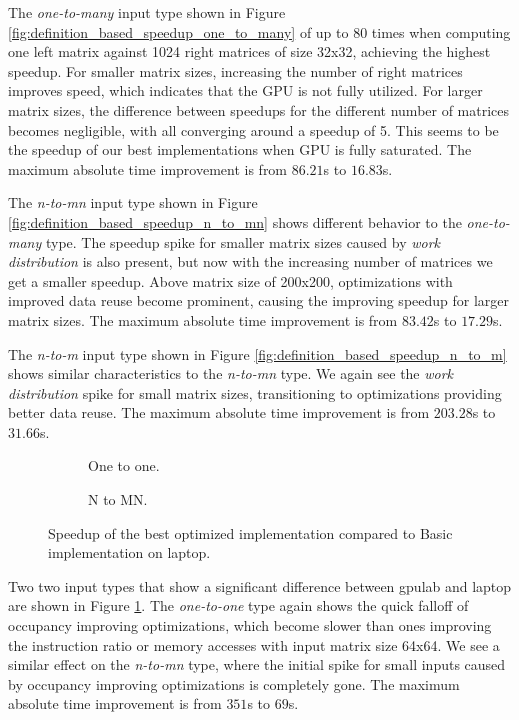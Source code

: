 The \textit{one-to-many} input type shown in Figure \ref{fig:definition_based_speedup_one_to_many} of up to 80 times when computing one left matrix against 1024 right matrices of size 32x32, achieving the highest speedup. For smaller matrix sizes, increasing the number of right matrices improves speed, which indicates that the GPU is not fully utilized. For larger matrix sizes, the difference between speedups for the different number of matrices becomes negligible, with all converging around a speedup of 5. This seems to be the speedup of our best implementations when GPU is fully saturated. The maximum absolute time improvement is from $86.21$s to $16.83$s. 

The \textit{n-to-mn} input type shown in Figure \ref{fig:definition_based_speedup_n_to_mn} shows different behavior to the \textit{one-to-many} type. The speedup spike for smaller matrix sizes caused by \textit{work distribution} is also present, but now with the increasing number of matrices we get a smaller speedup. Above matrix size of 200x200, optimizations with improved data reuse become prominent, causing the improving speedup for larger matrix sizes. The maximum absolute time improvement is from $83.42$s to $17.29$s. 

The \textit{n-to-m} input type shown in Figure \ref{fig:definition_based_speedup_n_to_m} shows similar characteristics to the \textit{n-to-mn} type. We again see the \textit{work distribution} spike for small matrix sizes, transitioning to optimizations providing better data reuse. The maximum absolute time improvement is from $203.28$s to $31.66$s.

\begin{figure}[ht]
	\centering	
	\begin{subfigure}{0.4\textwidth}
		\centering
		\def\svgwidth{\textwidth}
		
		\caption{One to one.}
	\end{subfigure}
	\begin{subfigure}{0.4\textwidth}
		\centering
		\def\svgwidth{\textwidth}
		
		\caption{N to MN.}
	\end{subfigure}
	\caption{Speedup of the best optimized implementation compared to Basic implementation on laptop.}
	\label{fig:definition_based_speedup_laptop}
\end{figure}

Two two input types that show a significant difference between gpulab and laptop are shown in Figure \ref{fig:definition_based_speedup_laptop}. The \textit{one-to-one} type again shows the quick falloff of occupancy improving optimizations, which become slower than ones improving the instruction ratio or memory accesses with input matrix size 64x64. We see a similar effect on the \textit{n-to-mn} type, where the initial spike for small inputs caused by occupancy improving optimizations is completely gone. The maximum absolute time improvement is from $351$s to $69$s.

